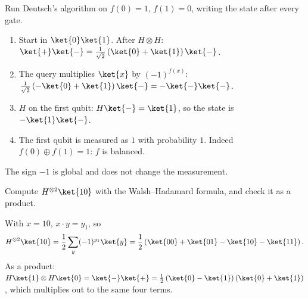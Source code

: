 \begin{exercisebox}
\begin{pproblem}[Deutsch on $f(x) = 1 - x$]\label{wp:deutsch}
    Run Deutsch's algorithm on $f(0) = 1$, $f(1) = 0$, writing the state after every gate.
\end{pproblem}
\tcblower
\begin{wsolution}
    \leavevmode
    \begin{enumerate}
        \item Start in $\ket{0}\ket{1}$. After $H \otimes H$:
              $\ket{+}\ket{-} = \frac{1}{\sqrt{2}}\left(\ket{0} + \ket{1}\right)\ket{-}$.
        \item The query multiplies $\ket{x}$ by $(-1)^{f(x)}$:
              $\frac{1}{\sqrt{2}}\left(-\ket{0} + \ket{1}\right)\ket{-} = -\ket{-}\ket{-}$.
        \item $H$ on the first qubit: $H\ket{-} = \ket{1}$, so the state is $-\ket{1}\ket{-}$.
        \item The first qubit is measured as $1$ with probability $1$. Indeed
              $f(0) \oplus f(1) = 1$: $f$ is balanced.
    \end{enumerate}
    The sign $-1$ is global and does not change the measurement.
\end{wsolution}
\end{exercisebox}

\begin{exercisebox}
\begin{pproblem}\label{wp:h2}
    Compute $H^{\otimes 2}\ket{10}$ with the Walsh--Hadamard formula, and check it as a product.
\end{pproblem}
\tcblower
\begin{wsolution}
    With $x = 10$, $x \cdot y = y_1$, so
    \[H^{\otimes 2}\ket{10} = \frac{1}{2} \sum_{y} (-1)^{y_1} \ket{y}
        = \frac{1}{2}\left(\ket{00} + \ket{01} - \ket{10} - \ket{11}\right).\]
    As a product: $H\ket{1} \otimes H\ket{0} = \ket{-}\ket{+}
        = \frac{1}{2}\left(\ket{0} - \ket{1}\right)\left(\ket{0} + \ket{1}\right)$, which multiplies
    out to the same four terms.
\end{wsolution}
\end{exercisebox}

